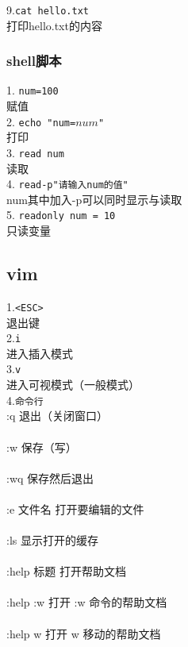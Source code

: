 \documentclass[a4paper,12pt]{article}
\begin{document}
9.\texttt{cat hello.txt}\\
打印hello.txt的内容\\



\subsubsection{shell脚本}
1. \texttt{num=100} \\
 赋值\\

2. \texttt{echo "num=$num$"} \\
 打印\\

3. \texttt{read num} \\
  读取\\

4. \texttt{read-p"请输入num的值"} \\
  num其中加入-p可以同时显示与读取\\

5. \texttt{readonly num = 10} \\
  只读变量\\


\subsection{vim}
1.\texttt{<ESC>}\\
退出键\\

2.\texttt{i}\\
进入插入模式\\

3.\texttt{v}\\
进入可视模式（一般模式）\\

4.\texttt{命令行}\\
:q 退出（关闭窗口）\\
\\:w 保存（写）\\
\\:wq 保存然后退出\\
\\:e {文件名} 打开要编辑的文件\\
\\:ls 显示打开的缓存\\
\\:help {标题} 打开帮助文档\\
\\:help :w 打开 :w 命令的帮助文档\\
\\:help w 打开 w 移动的帮助文档\\
\end{document}
